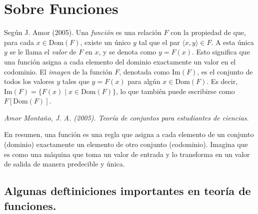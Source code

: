 \documentclass[11pt, a4paper]{article}
\begin{document}
\newpage

\section{Sobre Funciones}
  Según J. Amor (2005). Una \textit{función} es una relación \( F \) con la propiedad de que, para cada \( x \in \text{Dom}(F) \), existe un único \( y \) tal que el par \( \langle x, y \rangle \in F \). A esta única \( y \) se le llama el \textit{valor} de \( F \) en \( x \), y se denota como \( y = F(x) \). Esto significa que una función asigna a cada elemento del dominio exactamente un valor en el codominio. El \textit{imagen} de la función \( F \), denotada como \(\text{Im}(F)\), es el conjunto de todos los valores \( y \) tales que \( y = F(x) \) para algún \( x \in \text{Dom}(F) \). Es decir, \(\text{Im}(F) = \{ F(x) \mid x \in \text{Dom}(F) \}\), lo que también puede escribirse como \( F[\text{Dom}(F)] \).

\begin{flushright}
    \textit{Amor Montaño, J. A. (2005). Teoría de conjuntos para estudiantes de ciencias.}
\end{flushright}
  
  En resumen, una función es una regla que asigna a cada elemento de un conjunto (dominio) exactamente un elemento de otro conjunto (codominio). Imagina que es como una máquina que toma un valor de entrada y lo transforma en un valor de salida de manera predecible y única.

  \subsection{Algunas deftiniciones importantes en teoría de funciones.}
\end{document}
